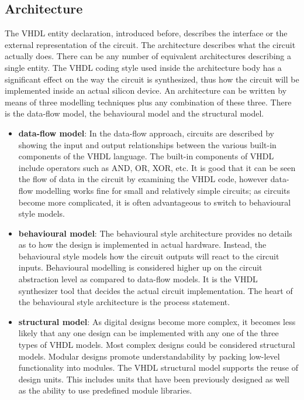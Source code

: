 \subsection{Architecture}
\noindent The VHDL entity declaration, introduced before, describes the interface or the external representation of the circuit. The architecture describes what the circuit actually does.
There can be any number of equivalent architectures describing a single entity. The VHDL coding style used inside
the architecture body has a significant effect on the way the circuit is
synthesized, thus how the circuit will be implemented inside an actual silicon device.
An architecture can be written by means of three modelling techniques
plus any combination of these three. There is the data-flow model, the behavioural model and the structural model.
\begin{itemize}
	\item \textbf{data-flow model}:
	\newline
	In the data-flow approach, circuits are described by showing the input and output relationships between the various built-in components of the VHDL language. The built-in components of VHDL include operators such as AND, OR, XOR, etc.
	It is good that it can be seen the flow of data in the circuit by examining the VHDL code, however data-flow modelling works fine for small and relatively simple circuits; as circuits become more complicated, it is often advantageous
	to switch to behavioural style models.
	\item \textbf{behavioural model}:
	\newline
	The behavioural style architecture provides no details as to how the design is implemented in actual hardware.
	Instead, the behavioural style models how the circuit outputs will react to the circuit inputs.
	Behavioural modelling is considered higher up on the circuit abstraction level as compared to data-flow models. It is the
	VHDL synthesizer tool that decides the actual circuit implementation.
	The heart of the behavioural style architecture is the process statement.
	\item \textbf{structural model}:
	\newline
	As digital designs become more complex, it becomes less likely that any one design can be implemented with any one of the three types of VHDL models. Most complex designs could be considered structural models. Modular designs promote understandability by packing low-level functionality into modules.
	The VHDL structural model supports the reuse of design units. This includes units that have been previously designed as well as the ability to use predefined module libraries.
	
\end{itemize}

